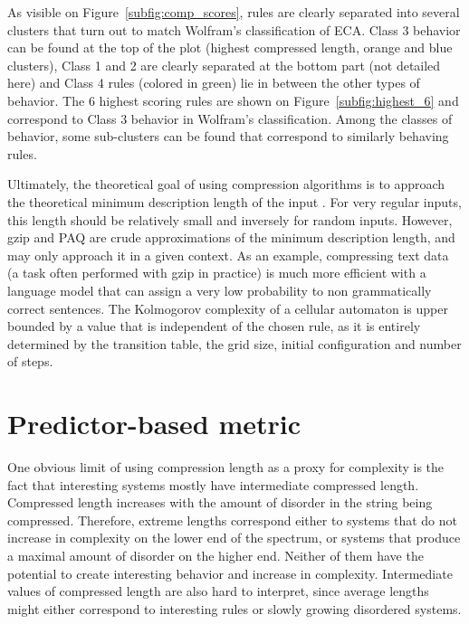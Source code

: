 As visible on Figure~\ref{subfig:comp_scores}, rules are clearly separated into
several clusters that turn out to match Wolfram’s classification of ECA. Class 3
behavior can be found at the top of the plot (highest compressed length, orange
and blue clusters), Class 1 and 2 are clearly separated at the bottom part (not
detailed here) and Class 4 rules (colored in green) lie in between the other
types of behavior. The 6 highest scoring rules are shown on
Figure~\ref{subfig:highest_6} and correspond to Class 3 behavior in Wolfram's
classification. Among the classes of behavior, some sub-clusters can be found
that correspond to similarly behaving rules.

Ultimately, the theoretical goal of using compression algorithms is to approach
the theoretical minimum description length of the input
\parencite{grunwaldMinimumDescriptionLength2007}. For very regular inputs, this
length should be relatively small and inversely for random inputs. However, gzip
and PAQ are crude approximations of the minimum description length, and may only
approach it in a given context. As an example, compressing text data (a task
often performed with gzip in practice) is much more efficient with a language
model that can assign a very low probability to non grammatically correct
sentences. The Kolmogorov complexity
\parencite{kolmogorovThreeApproachesQuantitative1968} of a cellular automaton is
upper bounded by a value that is independent of the chosen rule, as it is
entirely determined by the transition table, the grid size, initial
configuration and number of steps.

\section{Predictor-based metric}

One obvious limit of using compression length as a proxy for complexity is the
fact that interesting systems mostly have intermediate compressed length.
Compressed length increases with the amount of disorder in the string being
compressed. Therefore, extreme lengths correspond either to systems that do not
increase in complexity on the lower end of the spectrum, or systems that produce
a maximal amount of disorder on the higher end. Neither of them have the
potential to create interesting behavior and increase in complexity.
Intermediate values of compressed length are also hard to interpret, since
average lengths might either correspond to interesting rules or slowly growing
disordered systems.

